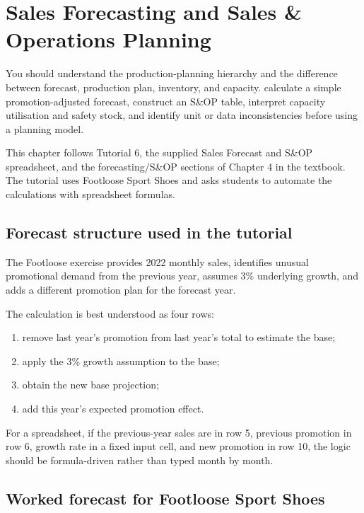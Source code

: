 \chapter{Sales Forecasting and Sales \& Operations Planning}
\label{ch:forecasting-sop}

\chapterguide
  {You should understand the production-planning hierarchy and the difference between forecast, production plan, inventory, and capacity.}
  {calculate a simple promotion-adjusted forecast, construct an S\&OP table, interpret capacity utilisation and safety stock, and identify unit or data inconsistencies before using a planning model.}

\begin{sourcebasis}
This chapter follows Tutorial 6, the supplied Sales Forecast and S\&OP spreadsheet, and the forecasting/S\&OP sections of Chapter 4 in the textbook. The tutorial uses Footloose Sport Shoes and asks students to automate the calculations with spreadsheet formulas.
\end{sourcebasis}

\section{Forecast structure used in the tutorial}

The Footloose exercise provides 2022 monthly sales, identifies unusual promotional demand from the previous year, assumes 3\% underlying growth, and adds a different promotion plan for the forecast year.

The calculation is best understood as four rows:

\begin{enumerate}
  \item remove last year's promotion from last year's total to estimate the base;
  \item apply the 3\% growth assumption to the base;
  \item obtain the new base projection;
  \item add this year's expected promotion effect.
\end{enumerate}

For a spreadsheet, if the previous-year sales are in row 5, previous promotion in row 6, growth rate in a fixed input cell, and new promotion in row 10, the logic should be formula-driven rather than typed month by month.

\section{Worked forecast for Footloose Sport Shoes}


